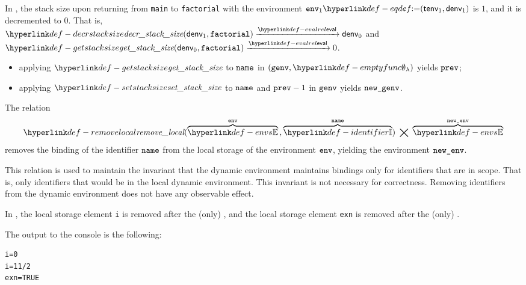 In , the stack size upon returning from \verb|main| to \verb|factorial|
with the environment $\env_1 \eqdef (\tenv_1, \denv_1)$ is $1$, and it is decremented to $0$.
That is, \\
$\decrstacksize(\denv_1, \factorial) \evalarrow \denv_0$
and\\
$\getstacksize(\denv_0, \factorial) \evalarrow 0$.

\ProseParagraph
\AllApply
\begin{itemize}
  \item applying $\getstacksize$ to $\name$ in $(\genv, \emptyfunc)$ yields $\vprev$;
  \item applying $\setstacksize$ to $\name$ and $\vprev - 1$ in $\genv$ yields $\newgenv$.
\end{itemize}

\FormallyParagraph
\begin{mathpar}
\end{mathpar}

\ProseParagraph
The relation
\hypertarget{def-removelocal}{}
\[
  \removelocal(\overname{\envs}{\env} \aslsep \overname{\Identifiers}{\name}) \;\aslrel\; \overname{\envs}{\newenv}
\]
removes the binding of the identifier $\name$ from the local storage of the environment $\env$,
yielding the environment $\newenv$.

This relation is used to maintain the invariant that the dynamic environment
maintains bindings only for identifiers that are in scope. That is, only identifiers
that would be in the local dynamic environment.
%
This invariant is not necessary for correctness.
Removing identifiers from the dynamic environment does not have any
observable effect.

In , the local storage element \verb|i| is removed after the (only) \forstatementterm,
and the local storage element \verb|exn| is removed after the (only) \trystatementterm.

The output to the console is the following:
\begin{Verbatim}[fontsize=\footnotesize, frame=single]
i=0
i=11/2
exn=TRUE
\end{Verbatim}

